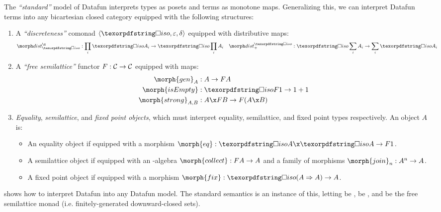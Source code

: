 \documentclass[nomarginums]{rntz}\usepackage[tablet]{fantasy}%
\begin{document}
The \emph{``standard''} model of Datafun interprets types as posets and terms as
monotone maps. Generalizing this, we can interpret Datafun terms into any
bicartesian closed category \catC{} equipped with the following structures:

\begin{enumerate}
\item A \emph{``discreteness''} comonad $\tuple{\disco{}, \varepsilon, \delta}$
  equipped with distributive maps:
%
  \begin{align*}
    \discox &: \prod_i \discof{A_i} \to \disco \prod_i A_i
    &
    \discosum &: \disco \sum_i A_i \to \sum_i \discof{A_i}
  \end{align*}

\item
  A \emph{``free semilattice''} functor \(F : \mathcal{C} \to \mathcal{C}\) equipped with maps:
%
  \begin{align*}
    \morph{gen}_A &: A \to \downof{A}\\
    \morph{isEmpty} &: \discof{\downof{\termO}} \to \termO + \termO\\
    \morph{strong}_{A,B} &: A \x \downof{B} \to \downof{(A \x B)}
  \end{align*}

\item \emph{Equality}, \emph{semilattice}, and \emph{fixed point
  objects}, which must interpret equality, semilattice, and fixed point types
  respectively. An object $A$ is:
  \begin{itemize}
  \item An equality object if equipped with a morphism $\morph{eq} : \discof A
    \x \discof A \to \downof \termO$.

  \item A semilattice object if equipped with an \down-algebra $\morph{collect} :
    \downof{A} \to A$ and a family of morphisms $\morph{join}_n : A^n \to A$.

  \item A fixed point object if equipped with a morphism $\morph{fix} :
    \discof{(\expO A A)} \to A$.
  \end{itemize}

\end{enumerate}

\noindent
{} shows how to interpret Datafun into any Datafun
model. The standard semantics is an instance of this, letting \catC{} be
\Poset{}, \iso{} be \iso{}, and \down{} be the free semilattice monad (i.e.
finitely-generated downward-closed sets).
\end{document}
